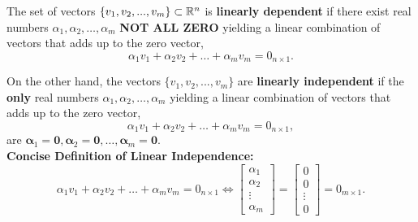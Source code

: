 \documentclass[letterpaper]{book}
\begin{document}
\begin{tcolorbox}[sharp corners, colback=green!30, colframe=green!80!blue, title=\textbf{Linear Independence of a Set of Vectors}]
 The set of vectors $\{v_1, v_2, ..., v_m \} \subset \mathbb R^n$ is \textbf{linearly dependent} if there exist real numbers $\alpha_1, \alpha_2, \ldots, \alpha_m$ \textbf{NOT ALL ZERO} yielding a linear combination of vectors that adds up to the zero vector,
\begin{equation}
    \alpha_1 v_1 + \alpha_2 v_2 + \ldots + \alpha_m v_m =0_{n \times 1}.
\end{equation}

On the other hand, the vectors $\{v_1, v_2, ..., v_m \}$ are \textbf{linearly independent} if the \textbf{only} real numbers $\alpha_1, \alpha_2, \ldots, \alpha_m$ yielding a linear combination of vectors that adds up to the zero vector,
\begin{equation}
    \alpha_1 v_1 + \alpha_2 v_2 + \ldots + \alpha_m v_m =0_{n \times 1},
    \end{equation}
are $\boldsymbol{\alpha}_1= \mathbf{0}, \boldsymbol{\alpha}_2=\mathbf{0}, \ldots, \boldsymbol{\alpha}_m=\mathbf{0}.$\\

\textbf{Concise Definition of Linear Independence:} 
$$\alpha_1 v_1 + \alpha_2 v_2 + \ldots + \alpha_m v_m =0_{n \times 1}  \iff \begin{bmatrix} \alpha_1 \\ \alpha_2 \\ \vdots \\ \alpha_m \end{bmatrix} = \begin{bmatrix} 0 \\ 0 \\ \vdots \\ 0 \end{bmatrix}= 0_{m \times 1}.$$
\end{tcolorbox}
\end{document}

